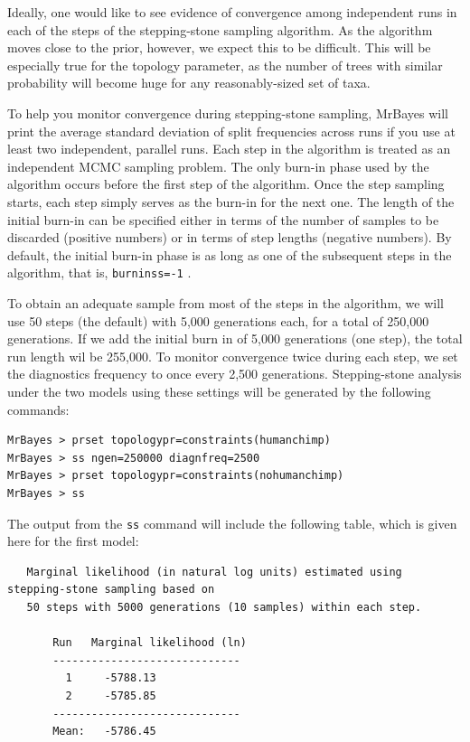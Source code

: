 \documentclass[12pt]{book}
\newcommand{\ttt}[1]{\texttt{#1} }
\begin{document}
Ideally, one would like to see evidence of convergence among independent runs in each of the steps
of the stepping-stone sampling algorithm. As the algorithm moves close to the prior, however, we
expect this to be difficult. This will be especially true for the topology parameter, as the number
of trees with similar probability will become huge for any reasonably-sized set of taxa.

To help you monitor convergence during stepping-stone sampling, MrBayes will print the average
standard deviation of split frequencies across runs if you use at least two independent, parallel
runs. Each step in the algorithm is treated as an independent MCMC sampling problem. The only
burn-in phase used by the algorithm occurs before the first step of the algorithm. Once the step
sampling starts, each step simply serves as the burn-in for the next one. The length of the initial
burn-in can be specified either in terms of the number of samples to be discarded (positive
numbers) or in terms of step lengths (negative numbers). By default, the initial burn-in phase is
as long as one of the subsequent steps in the algorithm, that is, \ttt{burninss=-1}.

To obtain an adequate sample from most of the steps in the algorithm, we will use 50 steps (the
default) with 5,000 generations each, for a total of 250,000 generations. If we add the initial
burn in of 5,000 generations (one step), the total run length wil be 255,000. To monitor
convergence twice during each step, we set the diagnostics frequency to once every 2,500
generations. Stepping-stone analysis under the two models using these settings will be generated by
the following commands:

\begin{singlespacing}
\begin{verbatim}
MrBayes > prset topologypr=constraints(humanchimp)
MrBayes > ss ngen=250000 diagnfreq=2500
MrBayes > prset topologypr=constraints(nohumanchimp)
MrBayes > ss
\end{verbatim}
\end{singlespacing}

The output from the \ttt{ss} command will include the following table, which is given here for the
first model:

\scriptsize
\begin{singlespacing}
\begin{verbatim}
   Marginal likelihood (in natural log units) estimated using stepping-stone sampling based on
   50 steps with 5000 generations (10 samples) within each step. 

       Run   Marginal likelihood (ln)
       -----------------------------
         1     -5788.13   
         2     -5785.85   
       -----------------------------
       Mean:   -5786.45
\end{verbatim}
\end{singlespacing}
\normalsize
\end{document}
